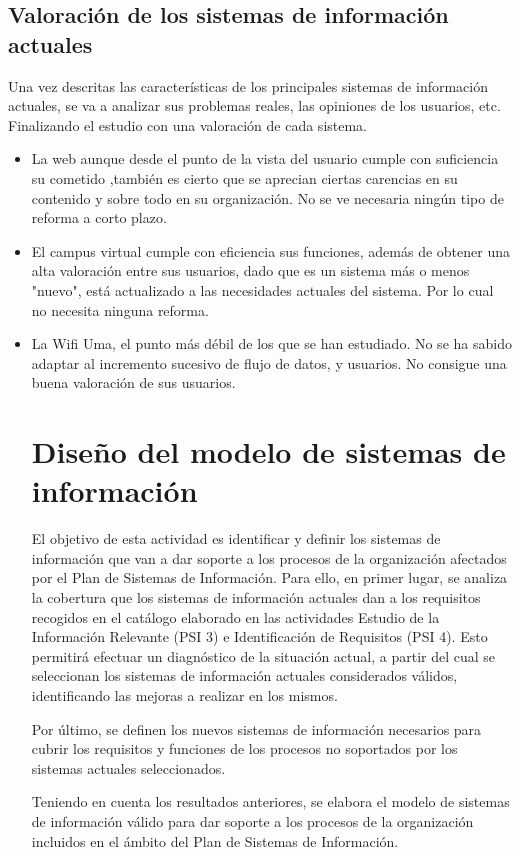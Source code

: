 \documentclass[11pt,a4paper,spanish,twoside]{book}
\begin{document}
\section{Valoración de los sistemas de información actuales}

Una vez descritas las características de los principales sistemas de 
información actuales, se va a analizar sus problemas reales, las opiniones de 
los usuarios, etc. Finalizando el estudio con una valoración de cada sistema.

\begin{itemize}
  \item La web aunque desde el punto de la vista del usuario cumple con 
suficiencia su cometido ,también es cierto que se aprecian ciertas carencias en 
su contenido y sobre todo en su organización. No se ve necesaria ningún tipo de 
reforma a corto plazo.
  \item El campus virtual cumple con eficiencia sus funciones, además de 
obtener una alta valoración entre sus usuarios, dado que es un sistema más o 
menos "nuevo", está actualizado a las necesidades actuales del sistema. Por lo 
cual no necesita ninguna reforma.
  \item La Wifi Uma, el punto más débil de los que se han estudiado. No se ha 
sabido adaptar al incremento sucesivo de flujo de datos, y usuarios. No 
consigue una buena valoración de sus usuarios. 
\chapter{Diseño del modelo de sistemas de información}
El objetivo de esta actividad es identificar y definir los sistemas de
información que van a dar soporte a los procesos de la organización afectados
por el Plan de Sistemas de Información. Para ello, en primer lugar, se
analiza la cobertura que los sistemas de información actuales dan a los
requisitos recogidos en el catálogo elaborado en las actividades Estudio de
la Información Relevante (PSI 3) e Identificación de Requisitos (PSI 4). Esto
permitirá efectuar un diagnóstico de la situación actual, a partir del cual
se seleccionan los sistemas de información actuales considerados válidos,
identificando las mejoras a realizar en los mismos. 

Por último, se definen los nuevos sistemas de información necesarios para
cubrir los requisitos y funciones de los procesos no soportados por los
sistemas actuales seleccionados. 

Teniendo en cuenta los resultados anteriores, se elabora el modelo de
sistemas de información válido para dar soporte a los procesos de la
organización incluidos en el ámbito del Plan de Sistemas de Información. 


\end{itemize}
\end{document}
